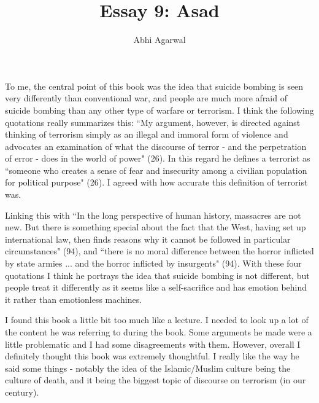 \documentclass[11pt, oneside]{article}
\title{Essay 9: Asad}
\author{Abhi Agarwal}
\date{}
\begin{document}
\maketitle

\par To me, the central point of this book was the idea that suicide bombing is seen very differently than conventional war, and people are much more afraid of suicide bombing than any other type of warfare or terrorism. I think the following quotations really summarizes this: ``My argument, however, is directed against thinking of terrorism simply as an illegal and immoral form of violence and advocates an examination of what the discourse of terror - and the perpetration of error - does in the world of power" (26). In this regard he defines a terrorist as ``someone who creates a sense of fear and insecurity among a civilian population for political purpose" (26). I agreed with how accurate this definition of terrorist was. 

\par Linking this with ``In the long perspective of human history, massacres are not new. But there is something special about the fact that the West, having set up international law, then finds reasons why it cannot be followed in particular circumstances" (94), and ``there is no moral difference between the horror inflicted by state armies ... and the horror inflicted by insurgents" (94). With these four quotations I think he portrays the idea that suicide bombing is not different, but people treat it differently as it seems like a self-sacrifice and has emotion behind it rather than emotionless machines. 

\par I found this book a little bit too much like a lecture. I needed to look up a lot of the content he was referring to during the book. Some arguments he made were a little problematic and I had some disagreements with them. However, overall I definitely thought this book was extremely thoughtful. I really like the way he said some things - notably the idea of the Islamic/Muslim culture being the culture of death, and it being the biggest topic of discourse on terrorism (in our century). 
\end{document}
